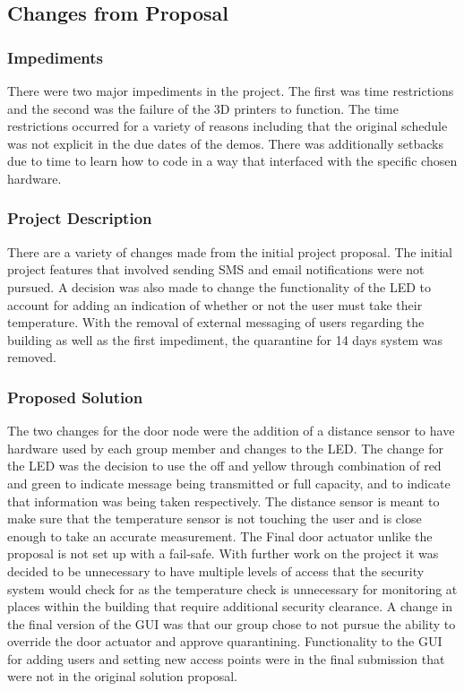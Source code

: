 \subsection{Changes from Proposal}

\subsubsection{Impediments}

There were two major impediments in the project. The first was time restrictions and the second was the failure of the 3D printers to function. The time restrictions occurred for a variety of reasons including that the original schedule was not explicit in the due dates of the demos. There was additionally setbacks due to time to learn how to code in a way that interfaced with the specific chosen hardware.

\subsubsection{Project Description}

There are a variety of changes made from the initial project proposal. The initial project features that involved sending SMS and email notifications were not pursued. A decision was also made to change the functionality of the LED to account for adding an indication of whether or not the user must take their temperature. With the removal of external messaging of users regarding the building as well as the first impediment, the quarantine for 14 days system was removed.

\subsubsection{Proposed Solution}

The two changes for the door node were the addition of a distance sensor to have hardware used by each group member and changes to the LED. The change for the LED was the decision to use the off and yellow through combination of red and green to indicate message being transmitted or full capacity, and to indicate that information was being taken respectively. The distance sensor is meant to make sure that the temperature sensor is not touching the user and is close enough to take an accurate measurement. The Final door actuator unlike the proposal is not set up with a fail-safe. With further work on the project it was decided to be unnecessary to have multiple levels of access that the security system would check for as the temperature check is unnecessary for monitoring at places within the building that require additional security clearance. A change in the final version of the GUI was that our group chose to not pursue the ability to override the door actuator and approve quarantining. Functionality to the GUI for adding users and setting new access points were in the final submission that were not in the original solution proposal.

